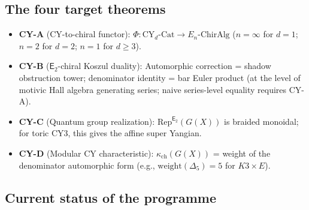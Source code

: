\documentclass[11pt]{article}
\newcommand{\Etwo}{\mathsf{E}_2}
\newcommand{\CY}{\mathrm{CY}}
\newcommand{\Rep}{\mathrm{Rep}}
\begin{document}
\subsection{The four target theorems}

\begin{itemize}
 \item \textbf{CY-A} (CY-to-chiral functor): $\Phi \colon \CY_d\text{-}\mathrm{Cat} \to E_n\text{-}\mathrm{ChirAlg}$ ($n = \infty$ for $d = 1$; $n = 2$ for $d = 2$; $n = 1$ for $d \geq 3$).
 \item \textbf{CY-B} ($\Etwo$-chiral Koszul duality): Automorphic correction = shadow obstruction tower; denominator identity = bar Euler product (at the level of motivic Hall algebra generating series; naive series-level equality requires CY-A).
 \item \textbf{CY-C} (Quantum group realization): $\Rep^{\Etwo}(G(X))$ is braided monoidal; for toric CY3, this gives the affine super Yangian.
 \item \textbf{CY-D} (Modular CY characteristic): $\kappa_{\mathrm{ch}}(G(X))$ = weight of the denominator automorphic form (e.g., $\mathrm{weight}(\Delta_5) = 5$ for $K3 \times E$).
\end{itemize}

\subsection{Current status of the programme}

\end{document}
